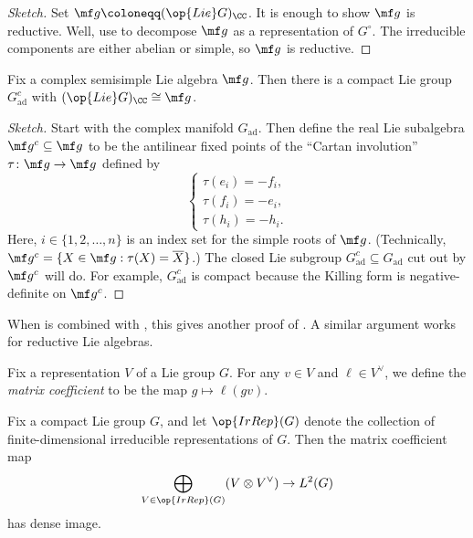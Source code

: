 \documentclass{article}
\begin{document}
\begin{proof}[Sketch]
	Set $\mf g\coloneqq(\op{Lie}G)_\CC$. It is enough to show $\mf g$ is reductive. Well, use  to decompose $\mf g$ as a representation of $G^\circ$. The irreducible components are either abelian or simple, so $\mf g$ is reductive.
\end{proof}
\begin{proposition} \label{prop:construct-compact-group}
	Fix a complex semisimple Lie algebra $\mf g$. Then there is a compact Lie group $G^c_{\mathrm{ad}}$ with $(\op{Lie}G)_\CC\cong\mf g$.
\end{proposition}
\begin{proof}[Sketch]
	Start with the complex manifold $G_{\mathrm{ad}}$. Then define the real Lie subalgebra $\mf g^c\subseteq\mf g$ to be the antilinear fixed points of the ``Cartan involution'' $\tau\colon\mf g\to\mf g$ defined by
	\[\begin{cases}
		\tau(e_i)=-f_i, \\
		\tau(f_i)=-e_i, \\
		\tau(h_i)=-h_i.
	\end{cases}\]
	Here, $i\in\{1,2,\ldots,n\}$ is an index set for the simple roots of $\mf g$. (Technically, $\mf g^c=\{X\in\mf g:\tau(X)=\overline X\}$.) The closed Lie subgroup $G^c_{\mathrm{ad}}\subseteq G_{\mathrm{ad}}$ cut out by $\mf g^c$ will do. For example, $G^c_{\mathrm{ad}}$ is compact because the Killing form is negative-definite on $\mf g^c$.
\end{proof}
\begin{remark}
	When  is combined with , this gives another proof of . A similar argument works for reductive Lie algebras.
\end{remark}
\begin{definition}
	Fix a representation $V$ of a Lie group $G$. For any $v\in V$ and $\ell\in V^\lor$, we define the \textit{matrix coefficient} to be the map $g\mapsto\ell(gv)$.
\end{definition}
\begin{theorem} \label{thm:pw}
	Fix a compact Lie group $G$, and let $\op{IrRep}(G)$ denote the collection of finite-dimensional irreducible representations of $G$. Then the matrix coefficient map
	\[\bigoplus_{V\in\op{IrRep}(G)}(V\otimes V^\lor)\to L^2(G)\]
	has dense image.
\end{theorem}
\end{document}
